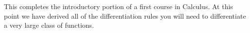 



This completes the introductory portion of a first course
in Calculus. At this point we have derived all of the differentiation
rules you will need to differentiate a very large class of functions. 
\begin{ProblemSection}
\end{ProblemSection}








